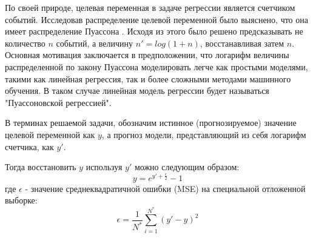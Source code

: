 По своей природе, целевая переменная в задаче регрессии является счетчиком событий. Исследовав распределение целевой переменной было выяснено, что она имеет распределение Пуассона \cite{pois_handbook}. Исходя из этого было решено предсказывать не количество $n$ событий, а величину $n' = log(1+n)$, восстанавливая затем $n$. Основная мотивация заключается в предположении, что логарифм величины распределенной по закону Пуассона моделировать легче как простыми моделями, такими как линейная регрессия, так и более сложными методами машинного обучения. В таком случае линейная модель регрессии будет называться "Пуассоновской регрессией".

В терминах решаемой задачи, обозначим истинное (прогнозируемое) значение целевой переменной как $y$, а прогноз модели, представляющий из себя логарифм счетчика, как $y'$. 

Тогда восстановить $y$ используя $y'$ можно следующим образом:
$$ y = e^{y' + \frac{\epsilon}{2}} - 1 $$
где $\epsilon$ - значение среднеквадратичной ошибки (MSE) на специальной отложенной выборке:
$$
\epsilon = \frac{1}{N^*}\sum_{i=1}^{N^*} (y' - y) ^ 2
$$
